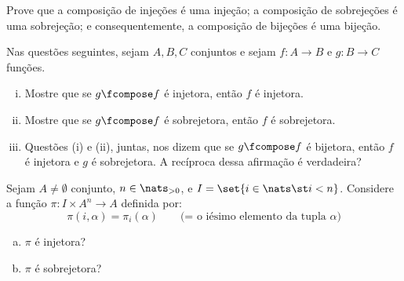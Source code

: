 \begin{exercise}
Prove que a composição de injeções é uma injeção; a composição de sobrejeções é uma sobrejeção; e consequentemente, a composição de bijeções é uma bijeção.
\end{exercise}

\begin{exercise}
Nas questões seguintes, sejam $A,B,C$ conjuntos e sejam $f:A \to B$ e $g:B \to C$ funções.
\begin{enumerate}[(i)]
    \item Mostre que se $g \fcompose f$ é injetora, então $f$ é injetora.
    \item Mostre que se $g \fcompose f$ é sobrejetora, então $f$ é sobrejetora.
    \item Questões (i) e (ii), juntas, nos dizem que se $g \fcompose f$ é bijetora, então $f$ é injetora e $g$ é sobrejetora. A recíproca dessa afirmação é verdadeira?
\end{enumerate}
\end{exercise}

\begin{exercise}
    Sejam $A \not = \emptyset$ conjunto, $n \in \nats_{>0}$, e $I = \set{i \in \nats \st i < n}$. Considere a função $\pi : I \times A^n \to A$ definida por:
    $$
        \pi (i, \alpha) = \pi_i(\alpha) \qquad \text{(= o iésimo elemento da tupla $\alpha$)}
    $$

    \begin{enumerate}[(a)]
        \item $\pi$ é injetora?
        \item $\pi$ é sobrejetora?
    \end{enumerate}
\end{exercise}
